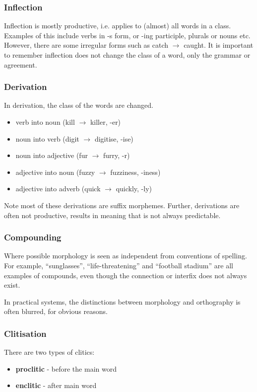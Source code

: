 \documentclass[Report.tex]{subfiles}
\begin{document}
\subsubsection{Inflection}
Inflection is mostly productive, i.e. applies to (almost) all words in a class.
Examples of this include verbs in -s form, or -ing participle, plurals
or nouns etc. However, there are some irregular forms such as
catch $\rightarrow$ caught. It is important to remember inflection does
not change the class of a word, only the grammar or agreement.

\subsubsection{Derivation}
In derivation, the class of the words are changed.
\begin{itemize}
\item verb into noun (kill $\rightarrow$ killer, -er)
\item noun into verb (digit $\rightarrow$ digitise, -ise)
\item noun into adjective (fur $\rightarrow$ furry, -r)
\item adjective into noun (fuzzy $\rightarrow$ fuzziness, -iness)
\item adjective into adverb (quick $\rightarrow$ quickly, -ly)
\end{itemize}
Note most of these derivations are suffix morphemes. Further,
derivations are often not productive, results in meaning that
is not always predictable.

\subsubsection{Compounding}
Where possible morphology is seen as independent from conventions
of spelling. For example, ``sunglasses'', ``life-threatening''
and ``football stadium'' are all examples of compounds, even though
the connection or interfix does not always exist.

In practical systems, the distinctions between morphology and
orthography is often blurred, for obvious reasons.

\subsubsection{Clitisation}
There are two types of clitics:
\begin{itemize}
\item \textbf{proclitic} - before the main word
\item \textbf{enclitic} - after main word
\end{itemize}
\end{document}
